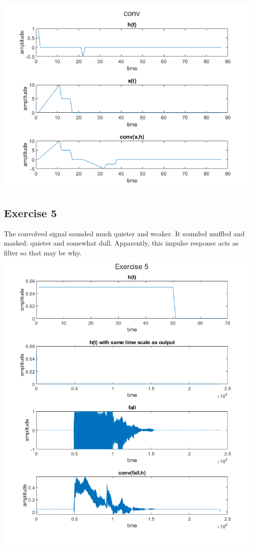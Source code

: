 \documentclass[11pt]{article}
\begin{document}
\includegraphics[scale=0.7]{neg_convolution.png}

\subsection{Exercise 5}

The convolved signal sounded much quieter and weaker.
It sounded muffled and masked: quieter and somewhat dull.
Apparently, this impulse response acts as filter so that may be why.\\



\includegraphics[width=\textwidth]{exercise5.png}
\end{document}
